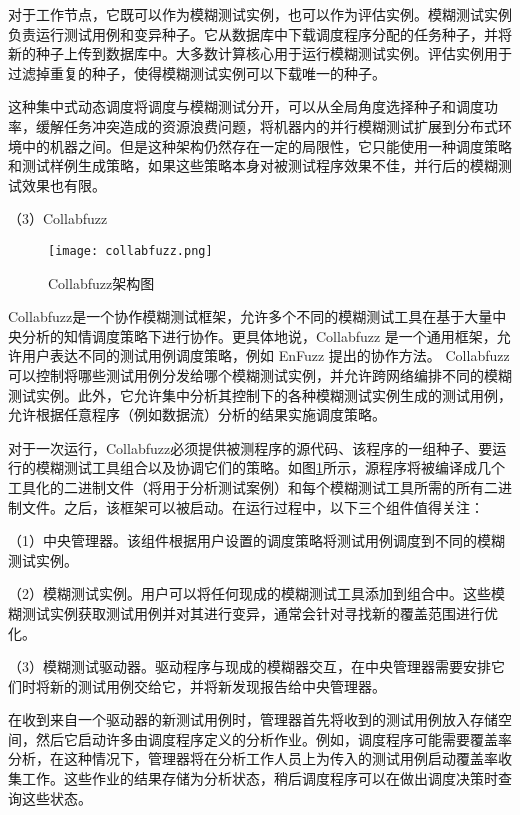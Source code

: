 \documentclass[master]{thesis-uestc}
\begin{document}
对于工作节点，它既可以作为模糊测试实例，也可以作为评估实例。模糊测试实例负责运行测试用例和变异种子。它从数据库中下载调度程序分配的任务种子，并将新的种子上传到数据库中。大多数计算核心用于运行模糊测试实例。评估实例用于过滤掉重复的种子，使得模糊测试实例可以下载唯一的种子。

这种集中式动态调度将调度与模糊测试分开，可以从全局角度选择种子和调度功率，缓解任务冲突造成的资源浪费问题，将机器内的并行模糊测试扩展到分布式环境中的机器之间。但是这种架构仍然存在一定的局限性，它只能使用一种调度策略和测试样例生成策略，如果这些策略本身对被测试程序效果不佳，并行后的模糊测试效果也有限。

（3）Collabfuzz

\begin{figure}[!htbp]
    \vspace{6pt}
    \centering
    \texttt{[image: collabfuzz.png]}
    \caption{Collabfuzz架构图}
    \label{collabfuzz}
\end{figure}

Collabfuzz是一个协作模糊测试框架，允许多个不同的模糊测试工具在基于大量中央分析的知情调度策略下进行协作。更具体地说，Collabfuzz 是一个通用框架，允许用户表达不同的测试用例调度策略，例如 EnFuzz 提出的协作方法。 Collabfuzz 可以控制将哪些测试用例分发给哪个模糊测试实例，并允许跨网络编排不同的模糊测试实例。此外，它允许集中分析其控制下的各种模糊测试实例生成的测试用例，允许根据任意程序（例如数据流）分析的结果实施调度策略。

对于一次运行，Collabfuzz必须提供被测程序的源代码、该程序的一组种子、要运行的模糊测试工具组合以及协调它们的策略。如图\ref{collabfuzz}所示，源程序将被编译成几个工具化的二进制文件（将用于分析测试案例）和每个模糊测试工具所需的所有二进制文件。之后，该框架可以被启动。在运行过程中，以下三个组件值得关注：

（1）中央管理器。该组件根据用户设置的调度策略将测试用例调度到不同的模糊测试实例。

（2）模糊测试实例。用户可以将任何现成的模糊测试工具添加到组合中。这些模糊测试实例获取测试用例并对其进行变异，通常会针对寻找新的覆盖范围进行优化。 

（3）模糊测试驱动器。驱动程序与现成的模糊器交互，在中央管理器需要安排它们时将新的测试用例交给它，并将新发现报告给中央管理器。

在收到来自一个驱动器的新测试用例时，管理器首先将收到的测试用例放入存储空间，然后它启动许多由调度程序定义的分析作业。例如，调度程序可能需要覆盖率分析，在这种情况下，管理器将在分析工作人员上为传入的测试用例启动覆盖率收集工作。这些作业的结果存储为分析状态，稍后调度程序可以在做出调度决策时查询这些状态。
\end{document}
